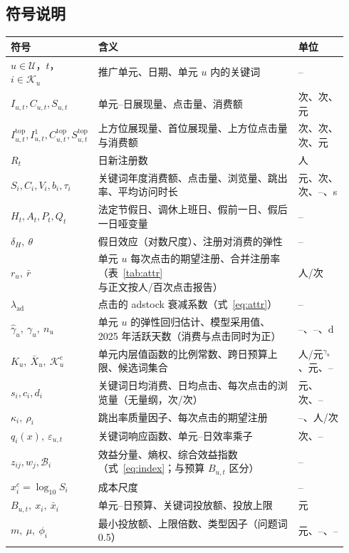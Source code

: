 \subsection{符号说明}
\small
\begin{longtable}{@{}p{0.2\linewidth}p{0.62\linewidth}p{0.12\linewidth}@{}}
\toprule 符号 & 含义 & 单位 \\ \midrule \endhead \bottomrule \endfoot
$u\in\mathcal U$，$t$，$i\in\mathcal K_u$ & 推广单元、日期、单元 $u$ 内的关键词 & -- \\
$I_{u,t},C_{u,t},S_{u,t}$ & 单元--日展现量、点击量、消费额 & 次、次、元 \\
$I^{\mathrm{top}}_{u,t},I^{1}_{u,t},C^{\mathrm{top}}_{u,t},S^{\mathrm{top}}_{u,t}$ & 上方位展现量、首位展现量、上方位点击量与消费额 & 次、次、次、元 \\
$R_t$ & 日新注册数 & 人 \\
$S_i,C_i,V_i,b_i,\tau_i$ & 关键词年度消费额、点击量、浏览量、跳出率、平均访问时长 & 元、次、次、--、s \\
$H_t,A_t,P_t,Q_t$ & 法定节假日、调休上班日、假前一日、假后一日哑变量 & -- \\
$\delta_H,\ \theta$ & 假日效应（对数尺度）、注册对消费的弹性 & -- \\
$r_u,\ \bar r$ & 单元 $u$ 每次点击的期望注册、合并注册率（表~\ref{tab:attr} 与正文按人/百次点击报告） & 人/次 \\
$\lambda_{\mathrm{ad}}$ & 点击的 adstock 衰减系数（式~\eqref{eq:attr}） & -- \\
$\hat\gamma_u,\ \gamma_u,\ n_u$ & 单元 $u$ 的弹性回归估计、模型采用值、2025 年活跃天数（消费与点击同时为正） & --、--、d \\
$K_u,\ \bar X_u,\ \mathcal K^{e}_u$ & 单元内层值函数的比例常数、跨日预算上限、候选词集合 & 人/元$^{\gamma_u}$、元、-- \\
$s_i,c_i,d_i$ & 关键词日均消费、日均点击、每次点击的浏览量（无量纲，次/次） & 元、次、-- \\
$\kappa_i,\ \rho_i$ & 跳出率质量因子、每次点击的期望注册 & --、人/次 \\
$q_i(x),\ \varepsilon_{u,t}$ & 关键词响应函数、单元--日效率乘子 & 次、-- \\
$z_{ij},w_j,\mathcal B_i$ & 效益分量、熵权、综合效益指数（式~\eqref{eq:index}；与预算 $B_{u,t}$ 区分） & -- \\
$x^{c}_i=\log_{10}S_i$ & 成本尺度 & -- \\
$B_{u,t},\ x_i,\ \bar x_i$ & 单元--日预算、关键词投放额、投放上限 & 元 \\
$m,\ \mu,\ \phi_i$ & 最小投放额、上限倍数、类型因子（问题词 0.5） & 元、--、-- \\

\end{longtable}
